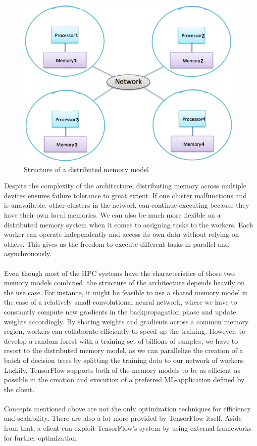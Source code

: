 \documentclass[ieeetran]{article}
\begin{document}
\begin{figure}[h!]
  \centering
  \includegraphics[width=0.4\linewidth]{distributedmemorymodel}
  \caption{Structure of a distributed memory model}
  \label{fig:distributedmemorymodel}
\end{figure}

\hspace{-0.52cm}Despite the complexity of the architecture, distributing memory across multiple devices ensures failure tolerance to great extent. If one cluster malfunctions and is unavailable, other clusters in the network can continue executing because they have their own local memories. We can also be much more flexible on a distributed memory system when it comes to assigning tasks to the workers. Each worker can operate independently and access its own data without relying on others. This gives us the freedom to execute different tasks in parallel and asynchronously.
\\ \\Even though most of the HPC systems have the characteristics of those two memory models combined, the structure of the architecture depends heavily on the use case. For instance, it might be feasible to use a shared memory model in the case of a relatively small convolutional neural network, where we have to constantly compute new gradients in the backpropagation phase and update weights accordingly. By sharing weights and gradients across a common memory region, workers can collaborate efficiently to speed up the training. However, to develop a random forest with a training set of billions of samples, we have to resort to the distributed memory model, as we can parallelize the creation of a batch of decision trees by splitting the training data to our network of workers. Luckily, TensorFlow supports both of the memory models to be as efficient as possible in the creation and execution of a preferred ML-application defined by the client. 
\\ \\Concepts mentioned above are not the only optimization techniques for efficiency and scalability. There are also a lot more provided by TensorFlow itself. Aside from that, a client can exploit TensorFlow's system by using external frameworks for further optimization. 
\end{document}
